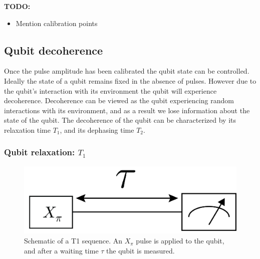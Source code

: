         \textbf{TODO:}
        \begin{itemize}
          \item Mention calibration points
        \end{itemize}

      \subsection{Qubit decoherence}
        Once the pulse amplitude has been calibrated the qubit state can be controlled. Ideally the state of a qubit remains fixed in the absence of pulses. However due to the qubit's interaction with its environment the qubit will experience decoherence. Decoherence can be viewed as the qubit experiencing random interactions with its environment, and as a result we lose information about the state of the qubit. The decoherence of the qubit can be characterized by its relaxation time $T_1$, and its dephasing time $T_2$.

        \subsubsection{Qubit relaxation: $T_1$}
          \label{sec:Qubit relaxation: $T_1$}
          \begin{figure}
            \begin{center}
            \vspace{-30pt}
              \includegraphics[width=\textwidth]{../Figures/Qubit characterization/T1 decoherence.png}
            \end{center}
            \vspace{-20 pt}
            \caption{Schematic of a T1 sequence. An $X_\pi$ pulse is applied to the qubit, and after a waiting time $\tau$ the qubit is measured.}
            \label{fig:T1 schematic}
          \end{figure}

